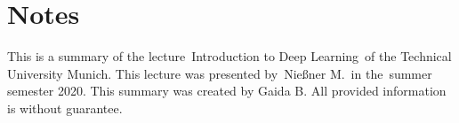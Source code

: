 \documentclass[10pt,a4paper]{article}
\newcommand{\lecture}{Introduction to Deep Learning} %
\newcommand{\lecturer}{Nießner M.} %
\newcommand{\semseter}{summer semester 2020} %
\begin{document}
\pagebreak
\section*{Notes}
This is a summary of the lecture~\lecture~of the Technical University Munich.
This lecture was presented by~\lecturer~in the~\semseter.
This summary was created by Gaida B.
All provided information is without guarantee.


\end{document}
